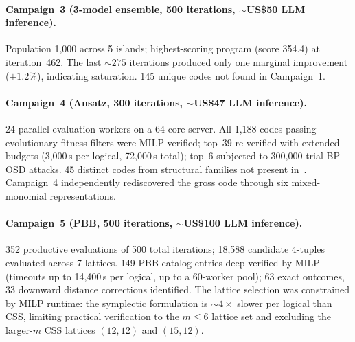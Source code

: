 \documentclass[aps,prxquantum,twocolumn,superscriptaddress,nofootinbib]{revtex4-2}
\begin{document}
\paragraph{Campaign~3 (3-model ensemble, 500 iterations, ${\sim}$US\$50 LLM inference).}
Population 1{,}000 across 5 islands; highest-scoring program (score 354.4) at iteration~462.
The last ${\sim}275$ iterations produced only one marginal improvement ($+1.2\%$), indicating saturation.
145 unique codes not found in Campaign~1.

\paragraph{Campaign~4 (Ansatz, 300 iterations, ${\sim}$US\$47 LLM inference).}
24 parallel evaluation workers on a 64-core server.
All 1{,}188 codes passing evolutionary fitness filters were MILP-verified; top~39 re-verified with extended budgets (3{,}000\,s per logical, 72{,}000\,s total); top~6 subjected to 300{,}000-trial BP-OSD attacks.
45 distinct codes from structural families not present in~\cite{bravyi2024high}.
Campaign~4 independently rediscovered the gross code through six mixed-monomial representations.

\paragraph{Campaign~5 (PBB, 500 iterations, ${\sim}$US\$100 LLM inference).}
352 productive evaluations of 500 total iterations; 18{,}588 candidate 4-tuples evaluated across 7 lattices.
149 PBB catalog entries deep-verified by MILP (timeouts up to 14{,}400\,s per logical, up to a 60-worker pool); 63 exact outcomes, 33 downward distance corrections identified.
The lattice selection was constrained by MILP runtime: the symplectic formulation is ${\sim}4\times$ slower per logical than CSS, limiting practical verification to the $m \leq 6$ lattice set and excluding the larger-$m$ CSS lattices $(12,12)$ and $(15,12)$.
\end{document}
